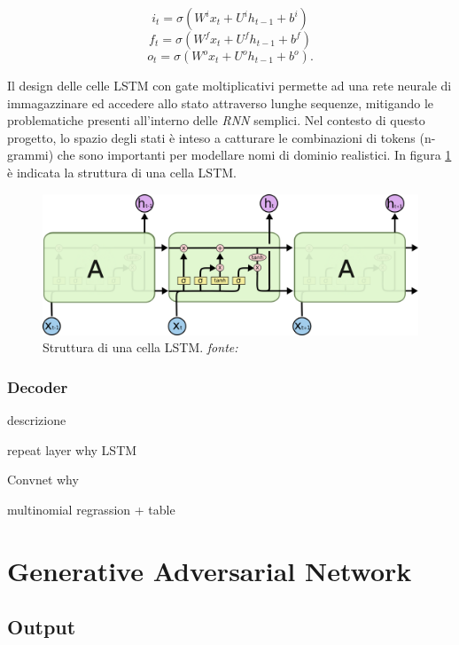 \[i_t=\sigma\left(W^ix_t+U^ih_{t-1}+b^i\right)\]
\[f_t=\sigma\left(W^fx_t+U^fh_{t-1}+b^f\right)\]
\[o_t=\sigma\left(W^ox_t+U^oh_{t-1}+b^o\right).\]


Il design delle celle LSTM con gate moltiplicativi permette ad una rete neurale di immagazzinare ed accedere allo stato attraverso lunghe sequenze, mitigando le problematiche presenti all'interno delle \textit{RNN} semplici. Nel contesto di questo progetto, lo spazio degli stati è inteso a catturare le combinazioni di tokens (n-grammi) che sono importanti per modellare nomi di dominio realistici. In figura \ref{fig:lstm} è indicata la struttura di una cella LSTM.

\begin{figure}[Htb]
    \centering
	\includegraphics[width=\columnwidth]{figures/LSTM3-chain.png}
	\caption{Struttura di una cella LSTM. \textit{fonte:} \cite{lstmblog} }
\label{fig:lstm}
\end{figure}


\subsubsection{Decoder}
descrizione

repeat layer why
LSTM

Convnet why

multinomial regrassion + table



\section{Generative Adversarial Network}
\label{advinterno}

\subsection{Output}
\label{advoutput}

